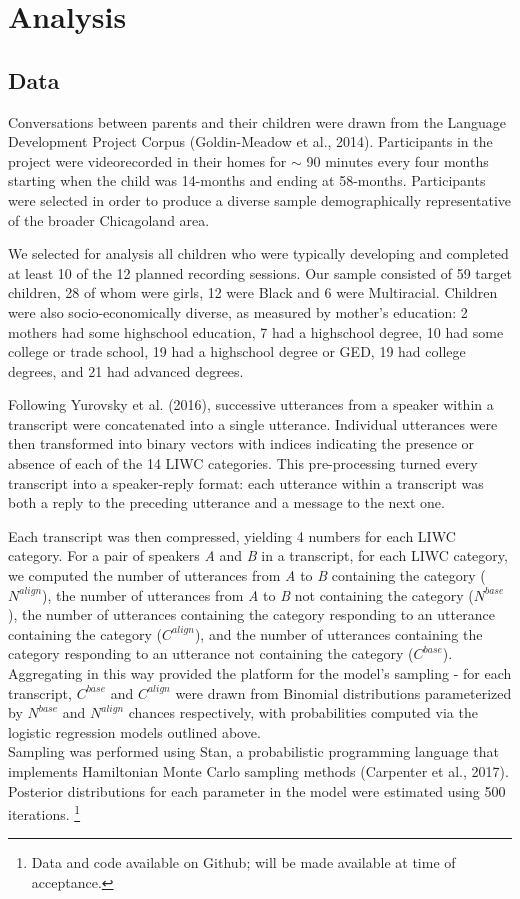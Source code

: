 \documentclass[10pt, letterpaper]{article}
\begin{document}
\hypertarget{analysis}{%
\section{Analysis}\label{analysis}}

\hypertarget{data}{%
\subsection{Data}\label{data}}

Conversations between parents and their children were drawn from the
Language Development Project Corpus (Goldin-Meadow et al., 2014).
Participants in the project were videorecorded in their homes for
\(\sim\) 90 minutes every four months starting when the child was
14-months and ending at 58-months. Participants were selected in order
to produce a diverse sample demographically representative of the
broader Chicagoland area.

We selected for analysis all children who were typically developing and
completed at least 10 of the 12 planned recording sessions. Our sample
consisted of 59 target children, 28 of whom were girls, 12 were Black
and 6 were Multiracial. Children were also socio-economically diverse,
as measured by mother's education: 2 mothers had some highschool
education, 7 had a highschool degree, 10 had some college or trade
school, 19 had a highschool degree or GED, 19 had college degrees, and
21 had advanced degrees.

Following Yurovsky et al. (2016), successive utterances from a speaker
within a transcript were concatenated into a single utterance.
Individual utterances were then transformed into binary vectors with
indices indicating the presence or absence of each of the 14 LIWC
categories. This pre-processing turned every transcript into a
speaker-reply format: each utterance within a transcript was both a
reply to the preceding utterance and a message to the next one.

Each transcript was then compressed, yielding 4 numbers for each LIWC
category. For a pair of speakers \emph{A} and \emph{B} in a transcript,
for each LIWC category, we computed the number of utterances from
\emph{A} to \emph{B} containing the category (\(N^{align}\)), the number
of utterances from \emph{A} to \emph{B} not containing the category
(\(N^{base}\)), the number of utterances containing the category
responding to an utterance containing the category (\(C^{align}\)), and
the number of utterances containing the category responding to an
utterance not containing the category (\(C^{base}\)). Aggregating in
this way provided the platform for the model's sampling - for each
transcript, \(C^{base}\) and \(C^{align}\) were drawn from Binomial
distributions parameterized by \(N^{base}\) and \(N^{align}\) chances
respectively, with probabilities computed via the logistic regression
models outlined above.\\
Sampling was performed using Stan, a probabilistic programming language
that implements Hamiltonian Monte Carlo sampling methods (Carpenter et
al., 2017). Posterior distributions for each parameter in the model were
estimated using 500 iterations.
\footnote{Data and code available on Github; will be made available at time of acceptance.}
\end{document}
